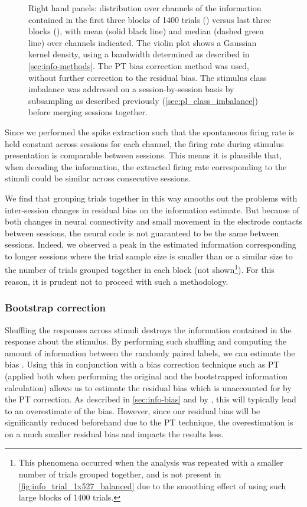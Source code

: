 \begin{figure}[htbp]
{Right hand panels: distribution over channels of the information contained in the first three blocks of \num{1400} trials () versus last three blocks (), with mean (solid black line) and median (dashed green line) over channels indicated.
The violin plot shows a Gaussian kernel density, using a bandwidth determined as described in \autoref{sec:info-methods}.
The \ac{PT} bias correction method was used, without further correction to the residual bias.
The stimulus class imbalance was addressed on a session-by-session basis by subsampling as described previously (\autoref{sec:pl_class_imbalance}) before merging sessions together.
}
    \label{fig:info_trial_1x527_balanced}
\end{figure}


Since we performed the spike extraction such that the spontaneous firing rate is held constant across sessions for each channel, the firing rate during stimulus presentation is comparable between sessions.
This means it is plausible that, when decoding the information, the extracted firing rate corresponding to the stimuli could be similar across consecutive sessions.

We find that grouping trials together in this way smooths out the problems with inter-session changes in residual bias on the information estimate.
But because of both changes in neural connectivity and small movement in the electrode contacts between sessions, the neural code is not guaranteed to be the same between sessions.
Indeed, we observed a peak in the estimated information corresponding to longer sessions where the trial sample size is smaller than or a similar size to the number of trials grouped together in each block (not shown\footnote{This phenomena occurred when the analysis was repeated with a smaller number of trials grouped together, and is not present in \autoref{fig:info_trial_1x527_balanced} due to the smoothing effect of using such large blocks of \num{1400} trials.}).
For this reason, it is prudent not to proceed with such a methodology.


\subsubsection{Bootstrap correction}
\label{sec:pl_bootstrapping}

Shuffling the responses across stimuli destroys the information contained in the response about the stimulus.
By performing such shuffling and computing the amount of information between the randomly paired labels, we can estimate the bias \citep{Optican1991}.
Using this in conjunction with a bias correction technique such as \ac{PT} (applied both when performing the original and the bootstrapped information calculation) allows us to estimate the residual bias which is unaccounted for by the \ac{PT} correction.
As described in \autoref{sec:info-bias} and by \citet{Panzeri1996}, this will typically lead to an overestimate of the bias.
However, since our residual bias will be significantly reduced beforehand due to the \ac{PT} technique, the overestimation is on a much smaller residual bias and impacts the results less.

